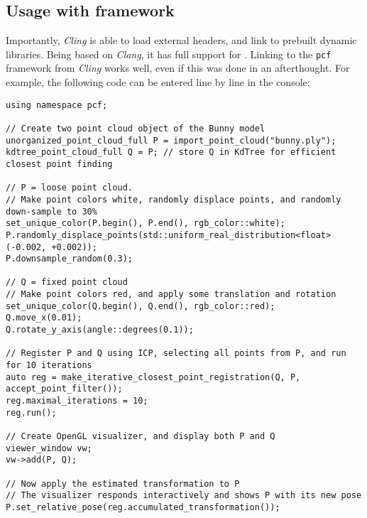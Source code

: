\subsection{Usage with framework}
Importantly, \emph{Cling} is able to load external \cpp{} headers, and link to prebuilt dynamic libraries. Being based on \emph{Clang}, it has full support for \cpp{}. Linking to the \texttt{pcf} framework from \emph{Cling} works well, even if this was done in an afterthought. For example, the following code can be entered line by line in the console:
\begin{lstlisting}
using namespace pcf;

// Create two point cloud object of the Bunny model
unorganized_point_cloud_full P = import_point_cloud("bunny.ply");
kdtree_point_cloud_full Q = P; // store Q in KdTree for efficient closest point finding

// P = loose point cloud.
// Make point colors white, randomly displace points, and randomly down-sample to 30%
set_unique_color(P.begin(), P.end(), rgb_color::white);
P.randomly_displace_points(std::uniform_real_distribution<float>(-0.002, +0.002));
P.downsample_random(0.3);

// Q = fixed point cloud
// Make point colors red, and apply some translation and rotation
set_unique_color(Q.begin(), Q.end(), rgb_color::red);
Q.move_x(0.01);
Q.rotate_y_axis(angle::degrees(0.1));

// Register P and Q using ICP, selecting all points from P, and run for 10 iterations
auto reg = make_iterative_closest_point_registration(Q, P, accept_point_filter());
reg.maximal_iterations = 10;
reg.run();

// Create OpenGL visualizer, and display both P and Q
viewer_window vw;
vw->add(P, Q);

// Now apply the estimated transformation to P
// The visualizer responds interactively and shows P with its new pose
P.set_relative_pose(reg.accumulated_transformation());
\end{lstlisting}


